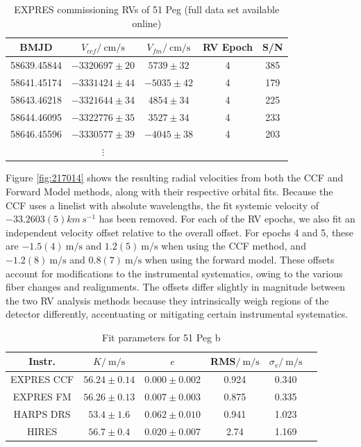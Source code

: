 \begin{table}[ht!]
    \centering
    \caption[51 Peg -- Commissioning radial velocities]{EXPRES commissioning RVs of 51 Peg (full data set available online)
    \label{tab:51pegvels}}
    \begin{tabular}{ccccc}
        \hline
        BMJD & $V_{ccf}/~\si{\centi\meter\per\second}$ & $V_{fm}/~\si{\centi\meter\per\second}$ & RV Epoch & S/N
        \\
        \hline
        58639.45844 & $-3320697\pm20$ & $ 5739\pm32$ & 4 & 385 \\
        58641.45174 & $-3331424\pm44$ & $-5035\pm42$ & 4 & 179 \\
        58643.46218 & $-3321644\pm34$ & $ 4854\pm34$ & 4 & 225 \\
        58644.46095 & $-3322776\pm35$ & $ 3527\pm34$ & 4 & 233 \\
        58646.45596 & $-3330577\pm39$ & $-4045\pm38$ & 4 & 203 \\
         & $\vdots$ & & \\
        \hline
    \end{tabular}
\end{table}

Figure \ref{fig:217014} shows the resulting radial velocities from both the CCF and Forward Model methods, along with their respective orbital fits. Because the CCF uses a linelist with absolute wavelengths, the fit systemic velocity of $-33.2603(5)\unit{km\,s^{-1}}$ \citep[in excellent agreement with][]{gaia_collaboration_vizier_2018} has been removed. For each of the RV epochs, we also fit an independent velocity offset relative to the overall offset. For epochs 4 and 5, these are $-1.5(4)~\si{\meter\per\second}$ and $1.2(5)~\si{\meter\per\second}$ when using the CCF method, and $-1.2(8)~\si{\meter\per\second}$ and $0.8(7)~\si{\meter\per\second}$ when using the forward model. These offsets account for modifications to the instrumental systematics, owing to the various fiber changes and realignments. The offsets differ slightly in magnitude between the two RV analysis methods because they intrinsically weigh regions of the detector differently, accentuating or mitigating certain instrumental systematics.

\begin{table}[ht!]
\centering
\caption[51 Peg b -- Keplerian orbital fit parameters]{Fit parameters for 51 Peg b\label{tab:51peg}}
\begin{tabular}{cccccc}
\hline
Instr. & $K/~\si{\meter\per\second}$ & $e$ & RMS$/~\si{\meter\per\second}$ & $\sigma_v/~\si{\meter\per\second}$ \\
\hline
EXPRES CCF & $56.24\pm0.14$ & $0.000\pm0.002$ & 0.924 & 0.340 \\
EXPRES FM & $56.26\pm0.13$ & $0.007\pm0.003$ & 0.875 & 0.335 \\
HARPS DRS & $53.4\pm1.6$ & $0.062\pm0.010$ & 0.941 & 1.023 \\
HIRES & $56.7\pm0.4$ & $0.020\pm0.007$ & 2.74 & 1.169 \\
\hline
\end{tabular}
\end{table}

